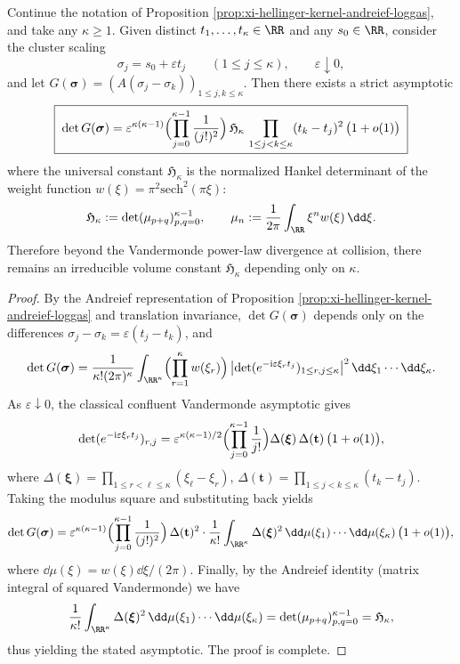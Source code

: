 \begin{theorem}\label{thm:xi-hellinger-gram-collision-hankel-constant}
Continue the notation of Proposition \ref{prop:xi-hellinger-kernel-andreief-loggas}, and take any \(\kappa\ge 1\).
Given distinct \(t_1,\dots,t_\kappa\in\RR\) and any \(s_0\in\RR\), consider the cluster scaling
\[
\sigma_j=s_0+\varepsilon t_j\qquad(1\le j\le \kappa),\qquad \varepsilon\downarrow 0,
\]
and let \(G(\boldsymbol{\sigma})=(A(\sigma_j-\sigma_k))_{1\le j,k\le\kappa}\).
Then there exists a strict asymptotic
\[
\boxed{\;
\det G(\boldsymbol{\sigma})
=\varepsilon^{\kappa(\kappa-1)}
\Bigl(\prod_{j=0}^{\kappa-1}\frac{1}{(j!)^{2}}\Bigr)\,
\mathfrak H_\kappa\,
\prod_{1\le j<k\le\kappa}(t_k-t_j)^{2}\,\bigl(1+o(1)\bigr)\;}
\]
where the universal constant \(\mathfrak H_\kappa\) is the normalized Hankel determinant of the weight function \(w(\xi)=\pi^{2}\mathrm{sech}^{2}(\pi\xi)\):
\[
\mathfrak H_\kappa:=\det(\mu_{p+q})_{p,q=0}^{\kappa-1},\qquad
\mu_n:=\frac{1}{2\pi}\int_{\RR}\xi^{n}w(\xi)\,\dd\xi.
\]
Therefore beyond the Vandermonde power-law divergence at collision, there remains an irreducible volume constant \(\mathfrak H_\kappa\) depending only on \(\kappa\).
\end{theorem}
\begin{proof}
By the Andreief representation of Proposition \ref{prop:xi-hellinger-kernel-andreief-loggas} and translation invariance, \(\det G(\boldsymbol{\sigma})\) depends only on the differences \(\sigma_j-\sigma_k=\varepsilon(t_j-t_k)\), and
\[
\det G(\boldsymbol{\sigma})
=\frac{1}{\kappa!(2\pi)^{\kappa}}
\int_{\RR^\kappa}\Bigl(\prod_{r=1}^{\kappa}w(\xi_r)\Bigr)\,
\bigl|\det(e^{-\mathrm{i}\varepsilon\xi_r t_j})_{1\le r,j\le\kappa}\bigr|^{2}\,\dd\xi_1\cdots\dd\xi_\kappa.
\]
As \(\varepsilon\downarrow 0\), the classical confluent Vandermonde asymptotic gives
\[
\det(e^{-\mathrm{i}\varepsilon\xi_r t_j})_{r,j}
=\varepsilon^{\kappa(\kappa-1)/2}\Bigl(\prod_{j=0}^{\kappa-1}\frac{1}{j!}\Bigr)
\Delta(\boldsymbol{\xi})\,\Delta(\mathbf t)\,\bigl(1+o(1)\bigr),
\]
where \(\Delta(\boldsymbol{\xi})=\prod_{1\le r<\ell\le\kappa}(\xi_\ell-\xi_r)\), \(\Delta(\mathbf t)=\prod_{1\le j<k\le\kappa}(t_k-t_j)\).
Taking the modulus square and substituting back yields
\[
\det G(\boldsymbol{\sigma})
=\varepsilon^{\kappa(\kappa-1)}\Bigl(\prod_{j=0}^{\kappa-1}\frac{1}{(j!)^{2}}\Bigr)\,
\Delta(\mathbf t)^{2}\cdot
\frac{1}{\kappa!}\int_{\RR^\kappa}\Delta(\boldsymbol{\xi})^{2}\,\dd\mu(\xi_1)\cdots\dd\mu(\xi_\kappa)\,\bigl(1+o(1)\bigr),
\]
where \(\dd\mu(\xi)=w(\xi)\dd\xi/(2\pi)\).
Finally, by the Andreief identity (matrix integral of squared Vandermonde) we have
\[
\frac{1}{\kappa!}\int_{\RR^\kappa}\Delta(\boldsymbol{\xi})^{2}\,\dd\mu(\xi_1)\cdots\dd\mu(\xi_\kappa)
=\det(\mu_{p+q})_{p,q=0}^{\kappa-1}=\mathfrak H_\kappa,
\]
thus yielding the stated asymptotic. The proof is complete.
\end{proof}

